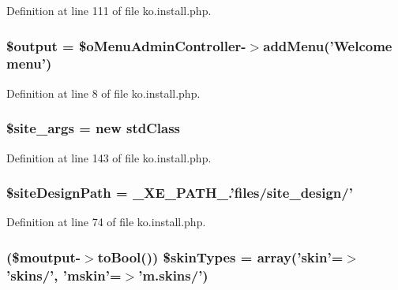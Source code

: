 Definition at line 111 of file ko.\+install.\+php.

\hypertarget{ko_8install_8php_a73004ce9cd673c1bfafd1dc351134797}{
\subsubsection[{\$output}]{\setlength{\rightskip}{0pt plus 5cm}\$output = \$o\+Menu\+Admin\+Controller-\/$>$add\+Menu('Welcome {\bf menu}')}}\label{ko_8install_8php_a73004ce9cd673c1bfafd1dc351134797}


Definition at line 8 of file ko.\+install.\+php.

\hypertarget{ko_8install_8php_a19e0fcfacd69155c9cc255e5500f6ccc}{
\subsubsection[{\$site\+\_\+args}]{\setlength{\rightskip}{0pt plus 5cm}\$site\+\_\+args = new std\+Class}}\label{ko_8install_8php_a19e0fcfacd69155c9cc255e5500f6ccc}


Definition at line 143 of file ko.\+install.\+php.

\hypertarget{ko_8install_8php_a0b79a974b91157b79d83cc0be7e3247c}{
\subsubsection[{\$site\+Design\+Path}]{\setlength{\rightskip}{0pt plus 5cm}\$site\+Design\+Path = \+\_\+\+X\+E\+\_\+\+P\+A\+T\+H\+\_\+.'files/site\+\_\+design/'}}\label{ko_8install_8php_a0b79a974b91157b79d83cc0be7e3247c}


Definition at line 74 of file ko.\+install.\+php.

\hypertarget{ko_8install_8php_aa61073b7b359568eb3459da113fd8cdf}{
\subsubsection[{\$skin\+Types}]{ (\$moutput-\/$>$to\+Bool()) \$skin\+Types = array('skin'=$>$'skins/', 'mskin'=$>$'m.\+skins/')}}\label{ko_8install_8php_aa61073b7b359568eb3459da113fd8cdf}


